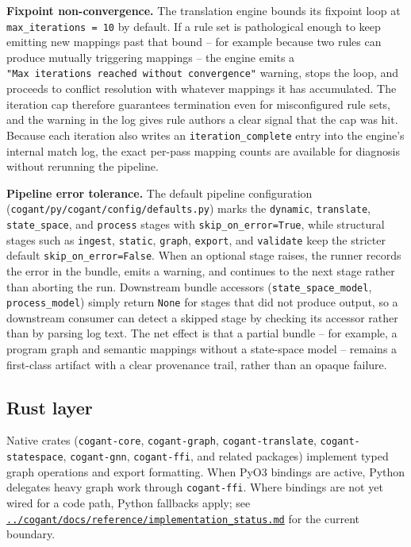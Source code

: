 \documentclass[
]{article}
\begin{document}
\textbf{Fixpoint non-convergence.} The translation engine bounds its
fixpoint loop at \texttt{max\_iterations\ =\ 10} by default. If a rule
set is pathological enough to keep emitting new mappings past that bound
-- for example because two rules can produce mutually triggering
mappings -- the engine emits a
\texttt{"Max\ iterations\ reached\ without\ convergence"} warning, stops
the loop, and proceeds to conflict resolution with whatever mappings it
has accumulated. The iteration cap therefore guarantees termination even
for misconfigured rule sets, and the warning in the log gives rule
authors a clear signal that the cap was hit. Because each iteration also
writes an \texttt{iteration\_complete} entry into the engine's internal
match log, the exact per-pass mapping counts are available for diagnosis
without rerunning the pipeline.

\textbf{Pipeline error tolerance.} The default pipeline configuration
(\texttt{cogant/py/cogant/config/defaults.py}) marks the
\texttt{dynamic}, \texttt{translate}, \texttt{state\_space}, and
\texttt{process} stages with \texttt{skip\_on\_error=True}, while
structural stages such as \texttt{ingest}, \texttt{static},
\texttt{graph}, \texttt{export}, and \texttt{validate} keep the stricter
default \texttt{skip\_on\_error=False}. When an optional stage raises,
the runner records the error in the bundle, emits a warning, and
continues to the next stage rather than aborting the run. Downstream
bundle accessors (\texttt{state\_space\_model}, \texttt{process\_model})
simply return \texttt{None} for stages that did not produce output, so a
downstream consumer can detect a skipped stage by checking its accessor
rather than by parsing log text. The net effect is that a partial bundle
-- for example, a program graph and semantic mappings without a
state-space model -- remains a first-class artifact with a clear
provenance trail, rather than an opaque failure.

\subsection{Rust layer}\label{rust-layer}

Native crates (\texttt{cogant-core}, \texttt{cogant-graph},
\texttt{cogant-translate}, \texttt{cogant-statespace},
\texttt{cogant-gnn}, \texttt{cogant-ffi}, and related packages)
implement typed graph operations and export formatting. When PyO3
bindings are active, Python delegates heavy graph work through
\texttt{cogant-ffi}. Where bindings are not yet wired for a code path,
Python fallbacks apply; see
\href{../cogant/docs/reference/implementation_status.md}{\texttt{../cogant/docs/reference/implementation\_status.md}}
for the current boundary.
\end{document}

